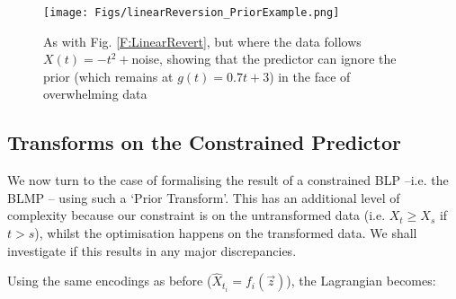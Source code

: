 \documentclass{article}
\newcounter{version}
\begin{document}
			\begin{figure}
				\texttt{[image: Figs/linearReversion\_PriorExample.png]}
				\caption{As with Fig. \ref{F:LinearRevert}, but where the data follows $X(t) = -t^2 + $noise, showing that the predictor can ignore the prior (which remains at $g(t) = 0.7t+3$) in the face of overwhelming data}\label{F:LinearPrior}
			\end{figure}
	\subsection*{Transforms on the Constrained Predictor}

		We now turn to the case of formalising the result of a constrained BLP --i.e. the BLMP -- using such a `Prior Transform'. This has an additional level of complexity because our constraint is on the untransformed data (i.e. $X_{t} \geq X_s$ if $t>s$), whilst the optimisation happens on the transformed data. We shall investigate if this results in any major discrepancies. 

		Using the same encodings as before ($\hat{X}_{t_i} = f_i(\vec{z})$), the Lagrangian becomes:
\end{document}
